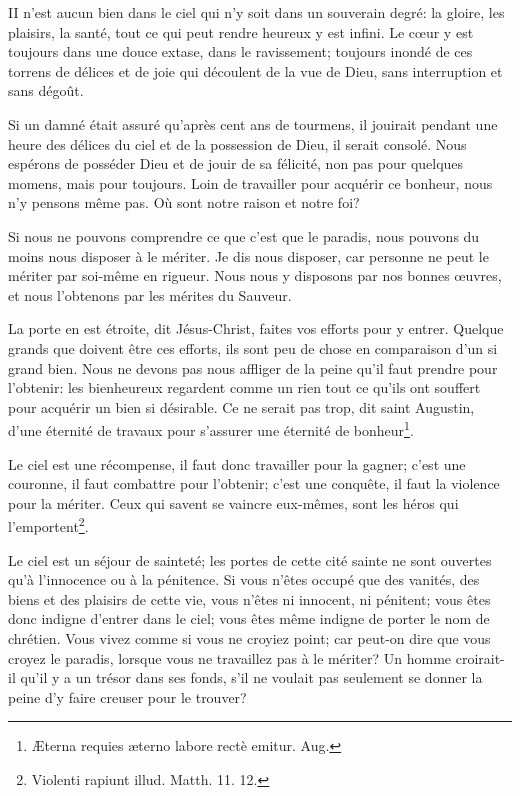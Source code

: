 \documentclass[instructions.tex]{subfiles}
\begin{document}
II n’est aucun bien dans le ciel qui n’y soit dans un souverain degré: la gloire, les plaisirs, la santé, tout ce qui peut rendre heureux y est infini. Le cœur y est toujours dans une douce extase, dans le ravissement; toujours inondé de ces torrens de délices et de joie qui découlent de la vue de Dieu, sans interruption et sans dégoût.
 
Si un damné était assuré qu’après cent ans de tourmens, il jouirait pendant une heure des délices du ciel et de la possession de Dieu, il serait consolé. Nous espérons de posséder Dieu et de jouir de sa félicité, non pas pour quelques momens, mais pour toujours. Loin de travailler pour acquérir ce bonheur, nous n’y pensons même pas. Où sont notre raison et notre foi?
 
\secundo Si nous ne pouvons comprendre ce que c’est que le paradis, nous pouvons du moins nous disposer à le mériter. Je dis nous disposer, car personne ne peut le mériter par soi-même en rigueur. Nous nous y disposons par nos bonnes œuvres, et nous l’obtenons par les mérites du Sauveur.
 
La porte en est étroite, dit Jésus-Christ, faites vos efforts pour y entrer. Quelque grands que doivent être ces efforts, ils sont peu de chose en comparaison d’un si grand bien. Nous ne devons pas nous affliger de la peine qu’il faut prendre pour l’obtenir: les bienheureux regardent comme un rien tout ce qu’ils ont souffert pour acquérir un bien si désirable. Ce ne serait pas trop, dit saint Augustin, d’une éternité de travaux pour s’assurer une éternité de bonheur\footnote{Æterna requies æterno labore rectè emitur. Aug.}.
 
Le ciel est une récompense, il faut donc travailler pour la gagner; c’est une couronne, il faut combattre pour l’obtenir; c’est une conquête, il faut la violence pour la mériter. Ceux qui savent se vaincre eux-mêmes, sont les héros qui l’emportent\footnote{Violenti rapiunt illud. Matth. 11. 12.}.
 
Le ciel est un séjour de sainteté; les portes de cette cité sainte ne sont ouvertes qu’à l’innocence ou à la pénitence. Si vous n’êtes occupé que des vanités, des biens et des plaisirs de cette vie, vous n’êtes ni innocent, ni pénitent; vous êtes donc indigne d’entrer dans le ciel; vous êtes même indigne de porter le nom de chrétien. Vous vivez comme si vous ne croyiez point; car peut-on dire que vous croyez le paradis, lorsque vous ne travaillez pas à le mériter? Un homme croirait-il qu’il y a un trésor dans ses fonds, s’il ne voulait pas seulement se donner la peine d’y faire creuser pour le trouver?
 
\end{document}
